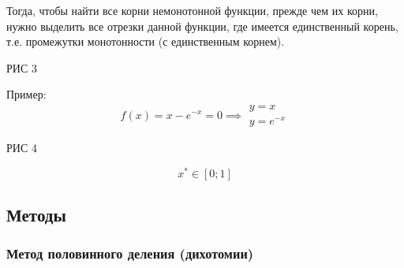 \documentclass[12pt]{article}
\begin{document}
Тогда, чтобы найти все корни немонотонной функции, прежде чем их корни,
нужно выделить все отрезки данной функции, где имеется единственный корень,
т.е. промежутки монотонности (с единственным корнем).

РИС 3

Пример:
\[
  f(x) = x - e^{-x} = 0 \implies \substack{y=x \\ y=e^{-x}}
\] 

РИС 4

\[
  x^{*} \in [0; 1]
\] 

\subsection{Методы}
\subsubsection{Метод половинного деления (дихотомии)}


\end{document}
